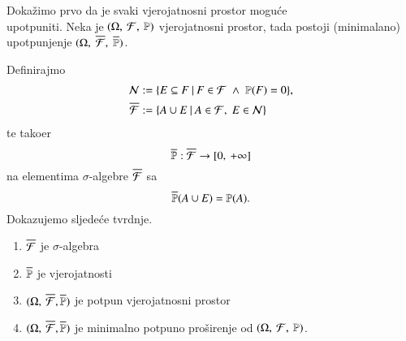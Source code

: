 \begin{rj}[\ref{zad:3.10}]  \label{rj:3.10}
    Doka\v zimo prvo da je svaki vjerojatnosni prostor mogu\' ce\\ upotpuniti.
    Neka je $(\Omega, \: \mathcal{F}, \: \mathbb{P})$ vjerojatnosni prostor, tada postoji (minimalano) upotpunjenje $(\Omega, \; \overline{\mathcal{F}}, \; \overline{\mathbb{P}})$.

    Definirajmo
    \begin{equation*}
        \begin{aligned}
            \mathcal{N} &:= \{{E \subseteq F} \: | \: {F \in \mathcal{F} \; \land \; \mathbb{P}({F}) = 0}\},\\
            \overline{\mathcal{F}} &:= \{{A \cup E} \: | \: {A \in \mathcal{F}, \; E \in \mathcal{N}}\}
        \end{aligned}
    \end{equation*}
    te tako\dj er
    \begin{equation*}
        \overline{\mathbb{P}} : \overline{\mathcal{F}} \to [{0}, \:{+\infty}]
    \end{equation*}
    na elementima $\sigma$-algebre $\overline{\mathcal{F}}$ sa
    \begin{equation*}
        \overline{\mathbb{P}}(A \cup E) = \mathbb{P}({A}).
    \end{equation*}
    Dokazujemo sljede\' ce tvrdnje.
    \begin{enumerate}[label=(\arabic*)]
        \item   \label{rj:3.10.1}
        $\overline{\mathcal{F}}$ je $\sigma$-algebra
        \item   \label{rj:3.10.2}
        $\overline{\mathbb{P}}$ je vjerojatnosti
        \item   \label{rj:3.10.3}
        $(\Omega, \: \overline{\mathcal{F}}, \overline{\mathbb{P}})$ je potpun vjerojatnosni prostor
        \item   \label{rj:3.10.4}
        $(\Omega, \: \overline{\mathcal{F}}, \overline{\mathbb{P}})$ je minimalno potpuno pro\v sirenje od $(\Omega, \: \mathcal{F}, \: \mathbb{P})$.
    \end{enumerate}


\end{rj}
